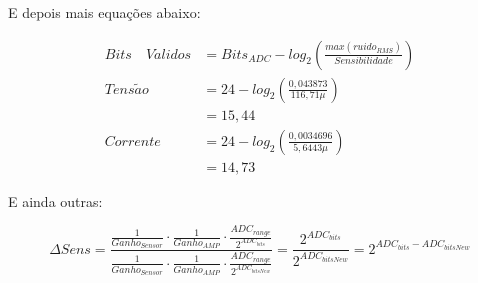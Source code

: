		E depois mais equações abaixo:

		\begin{align}
		Bits\quad V\acute{a}lidos &= Bits_{ADC} - log_2\left(\frac{max(ruido_{RMS})}{Sensibilidade}\right)	\label{eq:validbits}	\\[12pt]
		Tens\tilde{a}o 			&= 24 - log_2\left(\frac{0,043873}{116,71\mu}\right) \\
		&= 15,44	\label{eq:voltbits}						\\[12pt]
		Corrente				&= 24 - log_2\left(\frac{0,0034696}{5,6443\mu}\right) \\
		&= 14,73	\label{eq:currbits}
		\end{align}

		E ainda outras:

		\begin{equation}
		\label{eq:sensgain}
		\Delta Sens = \frac{\frac{1}{Ganho_{Sensor}} \cdot \frac{1}{Ganho_{AMP}} \cdot \frac{ADC_{range}}{2^{ADC_{bits}}}}{\frac{1}{Ganho_{Sensor}} \cdot \frac{1}{Ganho_{AMP}} \cdot \frac{ADC_{range}}{2^{ADC_{bitsNew}}}} = \frac{2^{ADC_{bits}}}{2^{ADC_{bitsNew}}} = 2^{ADC_{bits} - ADC_{bitsNew}}
		\end{equation}

